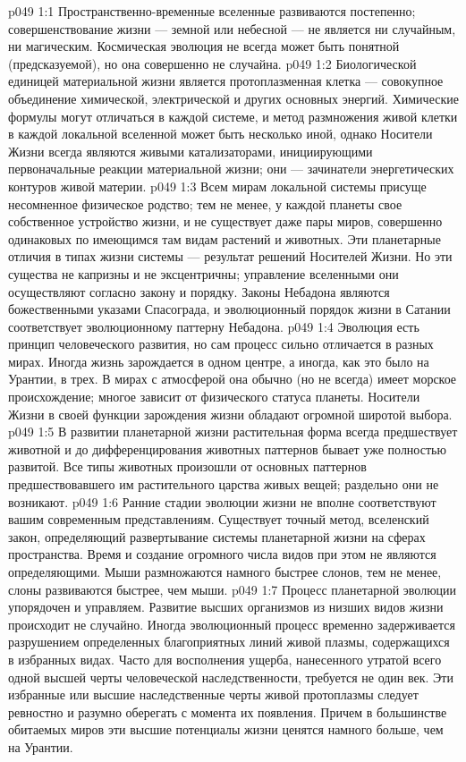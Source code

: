 \vs p049 1:1 Пространственно\hyp{}временные вселенные развиваются постепенно; совершенствование жизни --- земной или небесной --- не является ни случайным, ни магическим. Космическая эволюция не всегда может быть понятной (предсказуемой), но она совершенно не случайна.
\vs p049 1:2 Биологической единицей материальной жизни является протоплазменная клетка --- совокупное объединение химической, электрической и других основных энергий. Химические формулы могут отличаться в каждой системе, и метод размножения живой клетки в каждой локальной вселенной может быть несколько иной, однако Носители Жизни всегда являются живыми катализаторами, инициирующими первоначальные реакции материальной жизни; они --- зачинатели энергетических контуров живой материи.
\vs p049 1:3 Всем мирам локальной системы присуще несомненное физическое родство; тем не менее, у каждой планеты свое собственное устройство жизни, и не существует даже пары миров, совершенно одинаковых по имеющимся там видам растений и животных. Эти планетарные отличия в типах жизни системы --- результат решений Носителей Жизни. Но эти существа не капризны и не эксцентричны; управление вселенными они осуществляют согласно закону и порядку. Законы Небадона являются божественными указами Спасограда, и эволюционный порядок жизни в Сатании соответствует эволюционному паттерну Небадона.
\vs p049 1:4 Эволюция есть принцип человеческого развития, но сам процесс сильно отличается в разных мирах. Иногда жизнь зарождается в одном центре, а иногда, как это было на Урантии, в трех. В мирах с атмосферой она обычно (но не всегда) имеет морское происхождение; многое зависит от физического статуса планеты. Носители Жизни в своей функции зарождения жизни обладают огромной широтой выбора.
\vs p049 1:5 В развитии планетарной жизни растительная форма всегда предшествует животной и до дифференцирования животных паттернов бывает уже полностью развитой. Все типы животных произошли от основных паттернов предшествовавшего им растительного царства живых вещей; раздельно они не возникают.
\vs p049 1:6 Ранние стадии эволюции жизни не вполне соответствуют вашим современным представлениям.  Существует точный метод, вселенский закон, определяющий развертывание системы планетарной жизни на сферах пространства. Время и создание огромного числа видов при этом не являются определяющими. Мыши размножаются намного быстрее слонов, тем не менее, слоны развиваются быстрее, чем мыши.
\vs p049 1:7 Процесс планетарной эволюции упорядочен и управляем. Развитие высших организмов из низших видов жизни происходит не случайно. Иногда эволюционный процесс временно задерживается разрушением определенных благоприятных линий живой плазмы, содержащихся в избранных видах. Часто для восполнения ущерба, нанесенного утратой всего одной высшей черты человеческой наследственности, требуется не один век. Эти избранные или высшие наследственные черты живой протоплазмы следует ревностно и разумно оберегать с момента их появления. Причем в большинстве обитаемых миров эти высшие потенциалы жизни ценятся намного больше, чем на Урантии.
